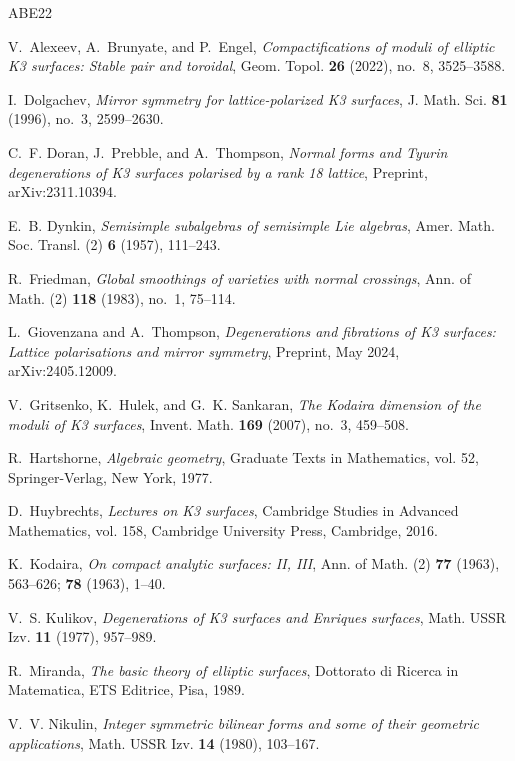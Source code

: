 \documentclass[11pt]{amsart}
\theoremstyle{plain}
\theoremstyle{definition}
\begin{document}
\begin{thebibliography}{ABE22}

 V.~Alexeev, A.~Brunyate, and P.~Engel,
\emph{Compactifications of moduli of elliptic {K3} surfaces: Stable pair and
toroidal}, Geom. Topol. \textbf{26} (2022), no.~8, 3525--3588.

 I.~Dolgachev,
\emph{Mirror symmetry for lattice-polarized {K3} surfaces},
J. Math. Sci. \textbf{81} (1996), no.~3, 2599--2630.

 C.~F. Doran, J.~Prebble, and A.~Thompson,
\emph{Normal forms and {T}yurin degenerations of {K3} surfaces polarised by a
rank 18 lattice}, Preprint, arXiv:2311.10394.

 E.~B. Dynkin,
\emph{Semisimple subalgebras of semisimple {L}ie algebras},
Amer. Math. Soc. Transl. (2) \textbf{6} (1957), 111--243.

 R.~Friedman,
\emph{Global smoothings of varieties with normal crossings},
Ann. of Math. (2) \textbf{118} (1983), no.~1, 75--114.

 L.~Giovenzana and A.~Thompson,
\emph{Degenerations and fibrations of {K3} surfaces: Lattice polarisations and
mirror symmetry}, Preprint, May 2024, arXiv:2405.12009.

 V.~Gritsenko, K.~Hulek, and G.~K. Sankaran,
\emph{The {K}odaira dimension of the moduli of {K3} surfaces},
Invent. Math. \textbf{169} (2007), no.~3, 459--508.

 R.~Hartshorne, \emph{Algebraic geometry},
Graduate Texts in Mathematics, vol. 52, Springer-Verlag, New York, 1977.

 D.~Huybrechts, \emph{Lectures on {K3} surfaces},
Cambridge Studies in Advanced Mathematics, vol. 158, Cambridge University
Press, Cambridge, 2016.

 K.~Kodaira,
\emph{On compact analytic surfaces: {II}, {III}},
Ann. of Math. (2) \textbf{77} (1963), 563--626; \textbf{78} (1963), 1--40.

 V.~S. Kulikov,
\emph{Degenerations of {K3} surfaces and {E}nriques surfaces},
Math. USSR Izv. \textbf{11} (1977), 957--989.

 R.~Miranda, \emph{The basic theory of elliptic surfaces},
Dottorato di Ricerca in Matematica, ETS Editrice, Pisa, 1989.

 V.~V. Nikulin,
\emph{Integer symmetric bilinear forms and some of their geometric
applications}, Math. USSR Izv. \textbf{14} (1980), 103--167.


\end{thebibliography}
\end{document}
